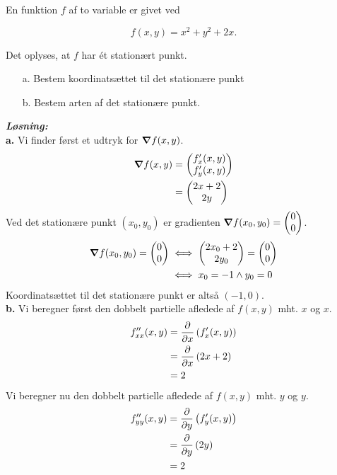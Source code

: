 \documentclass{article}
\newcommand{\sol}{\setlength{\parindent}{0cm}\textbf{\textit{Løsning:}}\setlength{\parindent}{1cm}}
\begin{document}
\begin{question}{}{}
  En funktion $f$ af to variable er givet ved

$$f(x,y)=x^2+y^2+2x.$$

Det oplyses, at $f$ har ét stationært punkt.
\begin{itemize}
  \item[a.] Bestem koordinatsættet til det stationære punkt
  \item[b.] Bestem arten af det stationære punkt.
\end{itemize}
\end{question}
\sol \\
\textbf{a.}
Vi finder først et udtryk for $\grad f(x,y)$.
\begin{equation*}
\begin{split}
  \grad f(x,y)&=\mqty(f'_x(x,y)\\ f'_y(x,y)) \\
  &=\mqty(2x+2\\ 2y) 
\end{split}
\end{equation*}
Ved det stationære punkt $(x_0,y_0)$ er gradienten $\grad f(x_0,y_0)=\mqty(0\\ 0)$. 
\begin{equation*}
\begin{split}
  \grad f(x_0,y_0)=\mqty(0\\ 0) &\iff \mqty(2x_0+2\\ 2y_0) =\mqty(0\\ 0) \\
  &\iff x_0=-1 \land y_0=0
\end{split}
\end{equation*}
Koordinatsættet til det stationære punkt er altså $(-1,0)$.\\[1ex]
\textbf{b.}
Vi beregner først den dobbelt partielle afledede af $f(x,y)$ mht. $x$ og $x$.
\begin{equation*}
\begin{split}
  f''_{xx}(x,y)&= \pdv{x} \left(f'_x(x,y)\right) \\
  &=\pdv{x} \left(2x+2\right) \\
  &=2
\end{split}
\end{equation*}
Vi beregner nu den dobbelt partielle afledede af $f(x,y)$ mht. $y$ og $y$.
\begin{equation*}
\begin{split}
  f''_{yy}(x,y)&= \pdv{y} \left(f'_y(x,y)\right) \\
  &=\pdv{y} \left(2y\right) \\
  &=2
\end{split}
\end{equation*}
\end{document}
